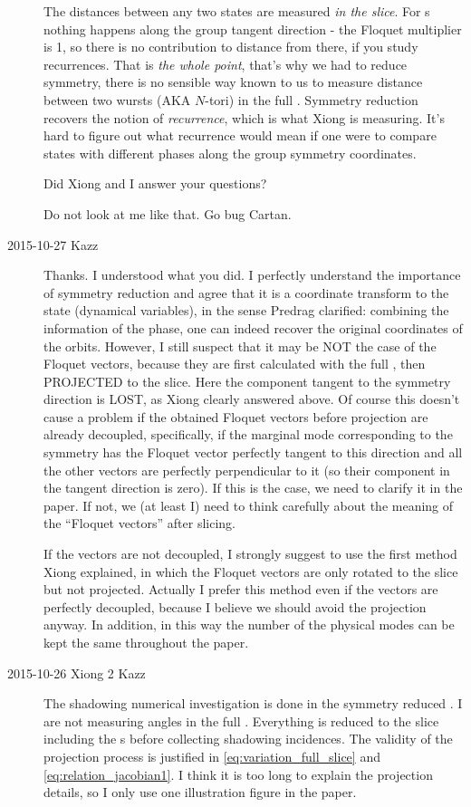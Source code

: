 \begin{description}
The distances between any two states are measured \emph{in the slice}. For
\rpo s nothing happens along the group tangent direction - the Floquet
multiplier is 1, so there is no contribution to distance from there, if
you study recurrences. That is \emph{the whole point}, that's why we had
to reduce symmetry, there is no sensible way known to us to measure
distance between two wursts (AKA $N$-tori) in the full \statesp. Symmetry
reduction recovers the notion of \emph{recurrence}, which is what Xiong
is measuring. It's hard to figure out what recurrence would mean if one
were to compare states with different phases along the group symmetry
coordinates.

Did Xiong and I answer your questions?

Do not look at me like that. Go bug Cartan.

\item[2015-10-27 Kazz]
Thanks. I understood what you did.
I perfectly understand the importance of symmetry reduction and agree that it is a coordinate transform to the state (dynamical variables), in the sense Predrag clarified: combining the information of the phase, one can indeed recover the original coordinates of the orbits. However, I still suspect that it may be NOT the case of the Floquet vectors, because they are first calculated with the full \statesp, then PROJECTED to the slice. Here the component tangent to the symmetry direction is LOST, as Xiong clearly answered above. Of course this doesn't cause a problem if the obtained Floquet vectors before projection are already decoupled, specifically, if the marginal mode corresponding to the symmetry has the Floquet vector perfectly tangent to this direction and all the other vectors are perfectly perpendicular to it (so their component in the tangent direction is zero). If this is the case, we need to clarify it in the paper. If not, we (at least I) need to think carefully about the meaning of the ``Floquet vectors'' after slicing.

If the vectors are not decoupled, I strongly suggest to use the first
method Xiong explained, in which the Floquet vectors are only rotated to
the slice but not projected. Actually I prefer this method even if the
vectors are perfectly decoupled, because I believe we should avoid the
projection anyway. In addition, in this way the number of the physical
modes can be kept the same throughout the paper.

\item[2015-10-26 Xiong 2 Kazz]
The shadowing numerical investigation is done in the symmetry
reduced \statesp. I are not measuring angles in the full
\statesp. Everything is reduced to the slice including the \Fv s
before collecting shadowing incidences.
The validity of the projection process is justified in
\eqref{eq:variation_full_slice} and \eqref{eq:relation_jacobian1}.
I think it is too long to explain the projection details, so I only
use one illustration figure in the paper.


\end{description}
